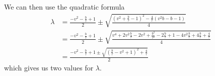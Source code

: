 We can then use the quadratic formula
\begin{align}
\lambda &= \frac{- v^2 - \frac{b}{\tau} + 1}{2} \pm  \sqrt{\frac{ \left( v^2 + \frac{b}{\tau} -1 \right)^2 - \frac{4}{\tau} \left(  v^2 b - b - 1 \right) }{4}} \\
&= \frac{- v^2 - \frac{b}{\tau} + 1}{2} \pm  \sqrt{\frac{ v^4 + 2v^2 \frac{b}{\tau} - 2v^2 + \frac{b^2}{\tau^2} - 2 \frac{b}{\tau} + 1 - 4v^2 \frac{b}{\tau} + 4\frac{b}{\tau} + \frac{4}{\tau} }{4}} \\
&= \frac{- v^2 - \frac{b}{\tau} + 1  \pm  \sqrt{ \left(\frac{b}{\tau} - v^2 + 1 \right)^2 + \frac{4}{\tau} }}{2}
\end{align}
which gives us two values for $\lambda$. 




























